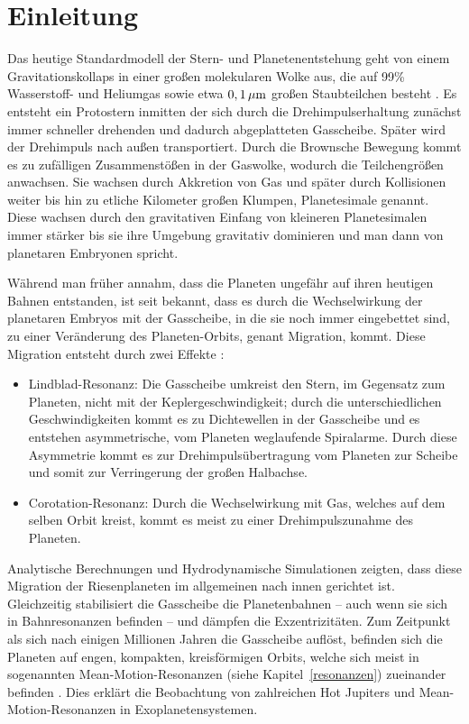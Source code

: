 \documentclass[12pt,a4paper,twoside,open=right,bibliography=totoc]{scrbook}
\renewcommand{\cite}{ \citep}
\newcommand{\refsec}[1]{siehe Kapitel~\ref{#1}}
\begin{document}
\cleardoublepage
\setcounter{page}{1}
\tableofcontents
\clearpage

\chapter{Einleitung}
Das heutige Standardmodell der Stern- und Planetenentstehung geht von einem Gravitationskollaps in einer großen molekularen Wolke aus, die auf 99\% Wasserstoff- und Heliumgas sowie etwa $\unit[0,1]{\mu m}$ großen Staubteilchen besteht\cite{Hanslmeier2002}. Es entsteht ein Protostern inmitten der sich durch die Drehimpulserhaltung zunächst immer schneller drehenden und dadurch abgeplatteten Gasscheibe.
Später wird der Drehimpuls nach außen transportiert. %
Durch die Brownsche Bewegung kommt es zu zufälligen Zusammenstößen in der Gaswolke, wodurch die Teilchengrößen anwachsen. Sie wachsen durch Akkretion von Gas und später durch Kollisionen weiter bis hin zu etliche Kilometer großen Klumpen, Planetesimale genannt.
Diese wachsen durch den gravitativen Einfang von kleineren Planetesimalen immer stärker bis sie ihre Umgebung gravitativ dominieren und man dann von planetaren Embryonen spricht. %

Während man früher annahm, dass die Planeten ungefähr auf ihren heutigen Bahnen entstanden, ist seit \cite{Goldreich1979,Goldreich1980} bekannt, dass es 
durch die Wechselwirkung der planetaren Embryos mit der Gasscheibe, in die sie noch immer eingebettet sind, zu einer Veränderung des Planeten-Orbits, genant Migration, kommt.
Diese Migration entsteht durch zwei Effekte\cite{Masset2008}:
\begin{itemize}
\item Lindblad-Resonanz: Die Gasscheibe umkreist den Stern, im Gegensatz zum Planeten, nicht mit der Keplergeschwindigkeit; durch die unterschiedlichen Geschwindigkeiten kommt es zu Dichtewellen in der Gasscheibe und es entstehen asymmetrische, vom Planeten weglaufende Spiralarme. Durch diese Asymmetrie kommt es zur Drehimpulsübertragung vom Planeten zur Scheibe und somit zur Verringerung der großen Halbachse.
\item Corotation-Resonanz: Durch die Wechselwirkung mit Gas, welches auf dem selben Orbit kreist, kommt es meist zu einer Drehimpulszunahme des Planeten.
\end{itemize}
Analytische Berechnungen und Hydrodynamische Simulationen zeigten, dass diese Migration der Riesenplaneten im allgemeinen nach innen gerichtet ist.
Gleichzeitig stabilisiert die Gasscheibe die Planetenbahnen -- auch wenn sie sich in Bahnresonanzen befinden -- und dämpfen die Exzentrizitäten.
Zum Zeitpunkt als sich nach einigen Millionen Jahren die Gasscheibe auflöst, befinden sich die Planeten auf engen, kompakten, kreisförmigen Orbits, welche sich meist in sogenannten Mean-Motion-Resonanzen (\refsec{resonanzen}) zueinander befinden\cite{Kley2000,Masset2001,Nesvorny2011}.
Dies erklärt die Beobachtung von zahlreichen Hot Jupiters und Mean-Motion-Resonanzen in Exoplanetensystemen.
\end{document}
